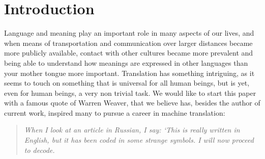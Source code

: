 \documentclass[a4paper, 11pt]{report}
\author{}
\title{}
\theoremstyle{definition}
\theoremstyle{plain}
\begin{document}
\maketitle
\tableofcontents




\chapter{Introduction}



Language and meaning play an important role in many aspects of our lives, and when means of transportation and communication over larger distances became more publicly available, contact with other cultures became more prevalent and being able to understand how meanings are expressed in other languages than your mother tongue more important. Translation has something intriguing, as it seems to touch on something that is universal for all human beings, but is yet, even for human beings, a very non trivial task. We would like to start this paper with a famous quote of Warren Weaver, that we believe has, besides the author of current work, inspired many to pursue a career in machine translation:

\begin{quote}
\textit{When I look at an article in Russian, I say: `This is really written in English, but it has been coded in some strange symbols. I will now proceed to decode.} \citep{weaver1955translation}
\end{quote}
\end{document}
